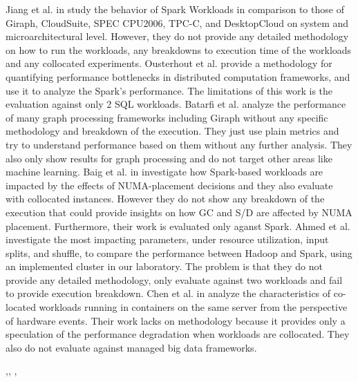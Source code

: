 Jiang et al. in \cite{inmem} study the behavior of Spark Workloads in
comparison to those of Giraph, CloudSuite, SPEC CPU2006, TPC-C, and
DesktopCloud on system and microarchitectural level. However, they do
not provide any detailed methodology on how to run the workloads, any
breakdowns to execution time of the workloads and any collocated
experiments. Ousterhout et al. \cite{makingsense} provide a
methodology for quantifying performance bottlenecks in distributed
computation frameworks, and use it to analyze the Spark’s performance.
The limitations of this work is the evaluation against only 2 SQL
workloads. Batarfi et al. \cite{giraphgraphalytics} analyze the
performance of many graph processing frameworks including Giraph
without any specific methodology and breakdown of the execution. They
just use plain metrics and try to understand performance based on them
without any further analysis. They also only show results for graph
processing and do not target other areas like machine learning. Baig
et al. in \cite{NUMA} investigate how Spark-based workloads are
impacted by the effects of NUMA-placement decisions and they also
evaluate with collocated instances. However they do not show any
breakdown of the execution that could provide insights on how GC and
S/D are affected by NUMA placement. Furthermore, their work is
evaluated only aganst Spark. Ahmed et al. \cite{hibench} investigate
the most impacting parameters, under resource utilization, input
splits, and shuffle, to compare the performance between Hadoop and
Spark, using an implemented cluster in our laboratory. The problem is
that they do not provide any detailed methodology, only evaluate
against two workloads and fail to provide execution breakdown. Chen et
al. in \cite{interference} analyze the characteristics of co-located
workloads running in containers on the same server from the
perspective of hardware events. Their work lacks on methodology
because it provides only a speculation of the performance degradation
when workloads are collocated. They also do not evaluate against
managed big data frameworks. 

\cite{CoLoc},\cite{SLA}, \cite{Hadoop-based}, \cite{splitserve}
